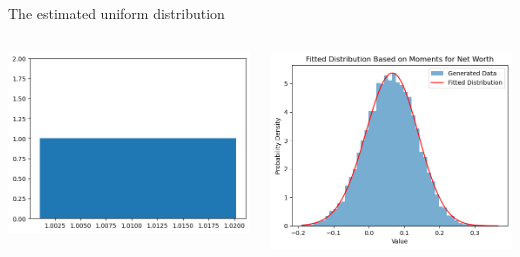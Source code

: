 \documentclass{beamer}
\begin{document}
\begin{frame}{The estimated uniform distribution}
\begin{columns}
    \centering
    \includegraphics[width=\textwidth]{Figures/estimated-PYunif.png}
    
    \centering
    \includegraphics[width=\textwidth]{Figures/Table3QuantileMatchingNetWorth.png}

  \end{columns}
\end{frame}
\end{document}
